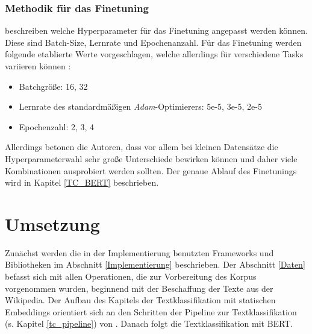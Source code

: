 \documentclass[ngerman]{ttlab-qualify}
\begin{document}
\subsection{Methodik für das Finetuning}
\textcite{devlin-etal-2019-bert} beschreiben welche Hyperparameter für das Finetuning angepasst werden können. Diese sind Batch-Size, Lernrate und Epochenanzahl. Für das Finetuning werden folgende etablierte Werte vorgeschlagen, welche allerdings für verschiedene Tasks variieren können \parencite[vgl.][13]{devlin-etal-2019-bert}:
\begin{itemize}
    \item Batchgröße: 16, 32
    \item Lernrate des standardmäßigen \textit{Adam}-Optimierers: 5e-5, 3e-5, 2e-5
    \item Epochenzahl: 2, 3, 4
\end{itemize}
Allerdings betonen die Autoren, dass vor allem bei kleinen Datensätze die Hyperparameterwahl sehr große Unterschiede bewirken können und daher viele Kombinationen ausprobiert werden sollten. Der genaue Ablauf des Finetunings wird in Kapitel \ref{TC_BERT} beschrieben.

\chapter{Umsetzung} \label{Umsetzung}
Zunächst werden die in der Implementierung benutzten Frameworks und Bibliotheken im Abschnitt \ref{Implementierung} beschrieben. Der Abschnitt \ref{Daten} befasst sich mit allen Operationen, die zur Vorbereitung des Korpus vorgenommen wurden, beginnend mit der Beschaffung der Texte aus der Wikipedia. Der Aufbau des Kapitels der Textklassifikation mit statischen Embeddings orientiert sich an den Schritten der Pipeline zur Textklassifikation (s. Kapitel \ref{tc_pipeline}) von \textcite{Kowsari_2019}. Danach folgt die Textklassifikation mit BERT.
\end{document}
